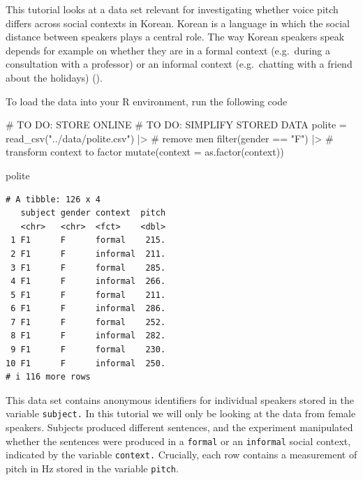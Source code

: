 \documentclass[
  doc,
  floatsintext,
  longtable,
  nolmodern,
  notxfonts,
  notimes,
  colorlinks=true,linkcolor=blue,citecolor=blue,urlcolor=blue]{apa7}
\newenvironment{Shaded}{\begin{snugshade}}{\end{snugshade}}
\newcommand{\AttributeTok}[1]{\textcolor[rgb]{0.40,0.45,0.13}{#1}}
\newcommand{\CommentTok}[1]{\textcolor[rgb]{0.37,0.37,0.37}{#1}}
\newcommand{\FunctionTok}[1]{\textcolor[rgb]{0.28,0.35,0.67}{#1}}
\newcommand{\NormalTok}[1]{\textcolor[rgb]{0.00,0.23,0.31}{#1}}
\newcommand{\OtherTok}[1]{\textcolor[rgb]{0.00,0.23,0.31}{#1}}
\newcommand{\SpecialCharTok}[1]{\textcolor[rgb]{0.37,0.37,0.37}{#1}}
\newcommand{\StringTok}[1]{\textcolor[rgb]{0.13,0.47,0.30}{#1}}
\begin{document}
This tutorial looks at a data set relevant for investigating whether
voice pitch diﬀers across social contexts in Korean. Korean is a
language in which the social distance between speakers plays a central
role. The way Korean speakers speak depends for example on whether they
are in a formal context (e.g.~during a consultation with a professor) or
an informal context (e.g.~chatting with a friend about the holidays)
().

To load the data into your R environment, run the following code

\begin{Shaded}
\begin{Highlighting}[]
\CommentTok{\# TO DO: STORE ONLINE}
\CommentTok{\# TO DO: SIMPLIFY STORED DATA}
\NormalTok{polite }\OtherTok{=} \FunctionTok{read\_csv}\NormalTok{(}\StringTok{"../data/polite.csv"}\NormalTok{) }\SpecialCharTok{|\textgreater{}} 
  \CommentTok{\# remove men}
  \FunctionTok{filter}\NormalTok{(gender }\SpecialCharTok{==} \StringTok{"F"}\NormalTok{) }\SpecialCharTok{|\textgreater{}} 
  \CommentTok{\# transform context to factor}
  \FunctionTok{mutate}\NormalTok{(}\AttributeTok{context =} \FunctionTok{as.factor}\NormalTok{(context))}

\NormalTok{polite}
\end{Highlighting}
\end{Shaded}

\begin{verbatim}
# A tibble: 126 x 4
   subject gender context  pitch
   <chr>   <chr>  <fct>    <dbl>
 1 F1      F      formal    215.
 2 F1      F      informal  211.
 3 F1      F      formal    285.
 4 F1      F      informal  266.
 5 F1      F      formal    211.
 6 F1      F      informal  286.
 7 F1      F      formal    252.
 8 F1      F      informal  282.
 9 F1      F      formal    230.
10 F1      F      informal  250.
# i 116 more rows
\end{verbatim}

This data set contains anonymous identifiers for individual speakers
stored in the variable \texttt{subject.} In this tutorial we will only
be looking at the data from female speakers. Subjects produced diﬀerent
sentences, and the experiment manipulated whether the sentences were
produced in a \texttt{formal} or an \texttt{informal} social context,
indicated by the variable \texttt{context.} Crucially, each row contains
a measurement of pitch in Hz stored in the variable \texttt{pitch}.
\end{document}
